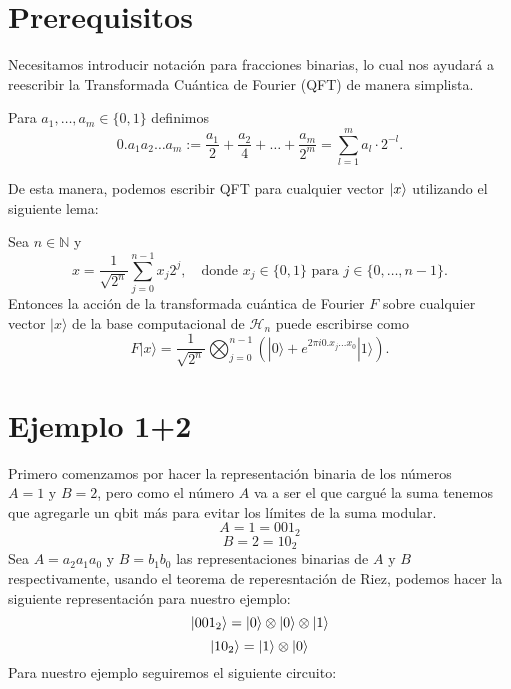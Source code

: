 \documentclass{article}
\begin{document}
\section{Prerequisitos}
\noindent Necesitamos introducir notación para fracciones binarias,
lo cual nos ayudará a reescribir la Transformada Cuántica de Fourier (QFT)
de manera simplista.
\begin{mydef}{}{}
    Para $a_1, \ldots, a_m \in \{0, 1\}$ definimos
\[
0.a_1a_2 \ldots a_m := \frac{a_1}{2} + \frac{a_2}{4} + \ldots + \frac{a_m}{2^m} =
\sum_{l=1}^{m} a_l \cdot 2^{-l}.
\]
\end{mydef}
De esta manera, podemos escribir QFT para cualquier vector \(\ket{x}\) utilizando el 
siguiente lema:
\begin{mylem}{}{}
    Sea $n \in \mathbb{N}$ y
    \[
    x = \frac{1}{\sqrt{2^n}} \sum_{j=0}^{n-1} x_j 2^j, \quad \text{donde } x_j \in \{0, 1\} \text{ para } j \in \{0, \ldots, n-1\}.
    \]
    Entonces la acción de la transformada cuántica de Fourier $F$ sobre cualquier vector $|x\rangle$ de la base computacional de $\mathcal{H}_n$ puede escribirse como
    \[
    F|x\rangle = \frac{1}{\sqrt{2^n}} \bigotimes_{j=0}^{n-1} \left( |0\rangle + e^{2\pi i 0.x_j \ldots x_0} |1\rangle \right).
    \]
\end{mylem}
\section{Ejemplo 1+2}
Primero comenzamos por hacer la representación binaria de los números
\(A = 1 \text{ y } B=2 \), pero como el número \(A\) va a ser el que cargué la suma
tenemos que agregarle un qbit más para evitar los límites de la suma modular.
\[A = 1 = 001_2\]
\[B=2=10_2\]
Sea \(A=a_{2}a_{1}a_{0}\) y \(B=b_1b_0\) las representaciones binarias de \(A \text{ y } B\)
respectivamente, usando el teorema de reperesntación de Riez, podemos hacer la siguiente representación
para nuestro ejemplo:
\[\ket{001_2}= \ket{0}\otimes\ket{0}\otimes\ket{1}\]
 \[\ket{10_2}=\ket{1}\otimes\ket{0}\]
Para nuestro ejemplo seguiremos el siguiente circuito:
\end{document}
